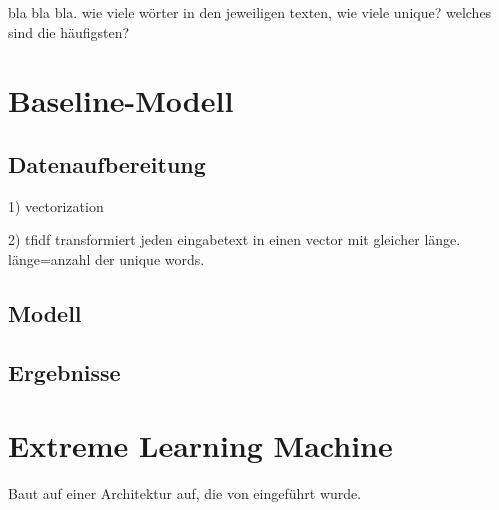 bla bla bla. wie viele wörter in den jeweiligen texten, wie viele unique? welches sind die häufigsten?
\section{Baseline-Modell}
\subsection{Datenaufbereitung}
1) vectorization

2) tfidf transformiert jeden eingabetext in einen vector mit gleicher länge. länge=anzahl der unique words.
\subsection{Modell}
\subsection{Ergebnisse}
\section{Extreme Learning Machine}
Baut auf einer Architektur auf, die von \cite{huangExtremeLearningMachine2006} eingeführt wurde.
